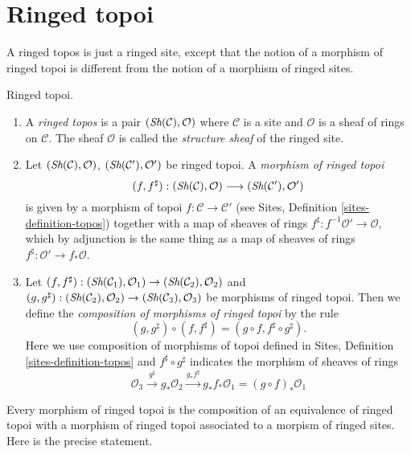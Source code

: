 \section{Ringed topoi}
\label{section-ringed-topoi}

\noindent
A ringed topos is just a ringed site, except that the notion of
a morphism of ringed topoi is different from the notion of a morphism
of ringed sites.

\begin{definition}
\label{definition-ringed-topos}
Ringed topoi.
\begin{enumerate}
\item A {\it ringed topos} is a pair
$(\mathop{\textit{Sh}}\nolimits(\mathcal{C}), \mathcal{O})$
where $\mathcal{C}$ is a site and $\mathcal{O}$ is a sheaf of rings
on $\mathcal{C}$. The sheaf $\mathcal{O}$ is called the
{\it structure sheaf} of the ringed site.
\item Let $(\mathop{\textit{Sh}}\nolimits(\mathcal{C}), \mathcal{O})$,
$(\mathop{\textit{Sh}}\nolimits(\mathcal{C}'), \mathcal{O}')$ be ringed topoi.
A {\it morphism of ringed topoi}
$$
(f, f^\sharp) :
(\mathop{\textit{Sh}}\nolimits(\mathcal{C}), \mathcal{O})
\longrightarrow
(\mathop{\textit{Sh}}\nolimits(\mathcal{C}'), \mathcal{O}')
$$
is given by a morphism of topoi $f : \mathcal{C} \to \mathcal{C}'$
(see Sites, Definition \ref{sites-definition-topos})
together with a map of sheaves of rings
$f^\sharp : f^{-1}\mathcal{O}' \to \mathcal{O}$, which by adjunction
is the same thing as a map of sheaves of rings
$f^\sharp : \mathcal{O}' \to f_*\mathcal{O}$.
\item Let
$(f, f^\sharp) :
(\mathop{\textit{Sh}}\nolimits(\mathcal{C}_1), \mathcal{O}_1)
\to (\mathop{\textit{Sh}}\nolimits(\mathcal{C}_2), \mathcal{O}_2)$ and
$(g, g^\sharp) :
(\mathop{\textit{Sh}}\nolimits(\mathcal{C}_2), \mathcal{O}_2) \to
(\mathop{\textit{Sh}}\nolimits(\mathcal{C}_3), \mathcal{O}_3)$
be morphisms of ringed topoi. Then we define
the {\it composition of morphisms of ringed topoi}
by the rule
$$
(g, g^\sharp) \circ (f, f^\sharp) = (g \circ f, f^\sharp \circ g^\sharp).
$$
Here we use composition of morphisms of topoi defined in
Sites, Definition \ref{sites-definition-topos}
and $f^\sharp \circ g^\sharp$ indicates the morphism of sheaves of
rings
$$
\mathcal{O}_3 \xrightarrow{g^\sharp} g_*\mathcal{O}_2
\xrightarrow{g_*f^\sharp} g_*f_*\mathcal{O}_1 = (g \circ f)_*\mathcal{O}_1
$$
\end{enumerate}
\end{definition}

\noindent
Every morphism of ringed topoi is the composition of an equivalence
of ringed topoi with a morphism of ringed topoi associated to a morpism
of ringed sites. Here is the precise statement.

